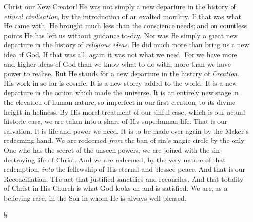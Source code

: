 \documentclass[12pt,a5paper,twoside,titlepage]{book}
\begin{document}
Christ our New Creator! He was not simply 
a new departure in the history of \textit{ethical civilisation}, 
by the introduction of an exalted morality. 
If that was what He came with, He brought much 
less than the conscience needs; and on countless 
points He has left us without guidance to-day. 
Nor was He simply a great new departure in the 
history of \textit{religious ideas}. He did much more 
than bring us a new idea of God. If that was 
all, again it was not what we need. For we 
have more and higher ideas of God than we 
know what to do with, more than we have 
power to realise. But He stands for a new 
departure in the history of \textit{Creation}. His work 
in so far is cosmic. It is a new storey added to 
the world. It is a new departure in the action 
which made the universe. It is an entirely new 
stage in the elevation of human nature, so 
imperfect in our first creation, to its divine 
height in holiness. By His moral treatment of 
our sinful case, which is our actual historic case, 
we are taken into a share of His superhuman 
life. That is our salvation. It is life and power 
we need. It is to be made over again by the 
Maker's redeeming hand. We are redeemed 
\textit{from} the ban of sin's magic circle by the only 
One who has the secret of the unseen powers; 
we are joined with the sin-destroying life of 
Christ. And we are redeemed, by the very 
nature of that redemption, \textit{into} the fellowship of 
His eternal and blessed peace. And that is our 
Reconciliation. The act that justified sanctifies 
and reconciles. And that totality of Christ in 
His Church is what God looks on and is satisfied. 
We are, as a believing race, in the Son in whom 
He is always well pleased. 

\begin{center}
\S
\end{center}
\end{document}
